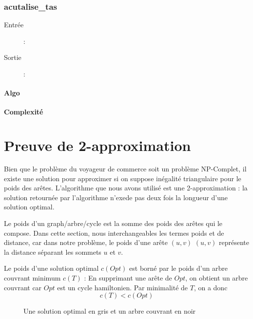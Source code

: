 \documentclass[a4paper,11pt]{article}
\begin{document}
\subsubsection*{acutalise\_tas}
\begin{description}
\item[Entrée] : 
\item[Sortie] : 
\end{description}
\paragraph*{Algo}
\paragraph*{Complexité}


\section{Preuve de 2-approximation} %
Bien que le problème du voyageur de commerce soit un problème NP-Complet, il existe une solution pour approximer si on suppose inégalité triangulaire pour le poids des arêtes. L'algorithme que nous avons utilisé est une 2-approximation : la solution retournée par l'algorithme n'exede pas deux fois la longueur d'une solution optimal.

Le poids d'un graph/arbre/cycle est la somme des poids des arêtes qui le compose.
Dans cette section, nous interchangeables les termes poids et de distance, car dans notre problème, le poids d'une arête $(u,v)$ $(u,v)$ représente la distance séparant les sommets $u$ et $v$.

Le poids d'une solution optimal $c(Opt)$ est borné par le poids d'un arbre couvrant minimum $c(T)$ :
En supprimant une arête de $Opt$, on obtient un arbre couvrant car $Opt$ est un cycle hamiltonien. Par minimalité de $T$, on a donc \begin{equation}
c(T) < c(Opt)
\label{eq1}
\end{equation}

\begin{figure}[!h]
\centering
{}
\caption{Une solution optimal en gris et un arbre couvrant en noir}
\end{figure}
\end{document}
